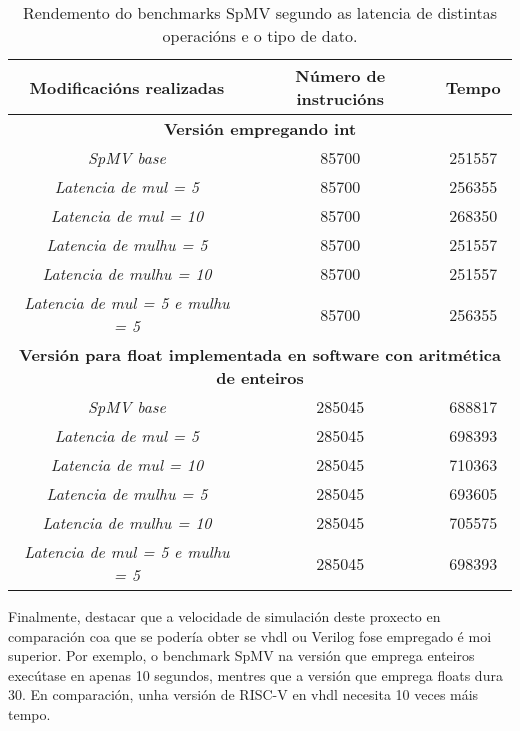 \begin{table}[hp!]
    \centering
    \begin{tabular}{c|c|c}
    \rowcolor{udcpink!25}
    \textbf{Modificacións realizadas} & \textbf{Número de instrucións}  & \textbf{Tempo} 
    \\\hline
    \multicolumn{3}{c}{\textbf{Versión empregando int}} \\
    \textit{SpMV base} & 85700 & 251557 \\
    \textit{Latencia de mul = 5} & 85700 & 256355\\
    \textit{Latencia de mul = 10} & 85700 & 268350\\
     \textit{Latencia de mulhu = 5} & 85700 & 251557\\ %
    \textit{Latencia de mulhu = 10} & 85700 & 251557\\ 
    \textit{Latencia de mul = 5 e mulhu = 5} & 85700 & 256355\\
    
    \multicolumn{3}{c}{\textbf{Versión para float implementada en software con aritmética de enteiros}} \\
    \textit{SpMV base} & 285045 & 688817 \\
    \textit{Latencia de mul = 5} & 285045 & 698393\\
    \textit{Latencia de mul = 10} & 285045 & 710363\\
     \textit{Latencia de mulhu = 5} & 285045 & 693605\\ 
    \textit{Latencia de mulhu = 10} & 285045 & 705575\\ 
    \textit{Latencia de mul = 5 e mulhu = 5} & 285045 & 698393\\
    \end{tabular}
    \caption{Rendemento do benchmarks SpMV segundo as latencia de distintas operacións e o tipo de dato.}
    \label{tab:rendemento_spmv}
\end{table}

Finalmente, destacar que a velocidade de simulación deste proxecto en comparación coa que se podería obter se \acrshort{vhdl} ou Verilog fose empregado é moi superior. Por exemplo, o benchmark SpMV na versión que emprega enteiros execútase en apenas 10 segundos, mentres que a versión que emprega floats dura 30. En comparación, unha versión de RISC-V en \acrshort{vhdl} necesita 10 veces máis tempo.